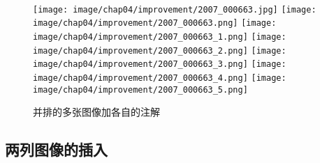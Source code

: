 \begin{figure}[h]
    \centering
        \enspace
        \enspace
        \enspace\thinspace
        \enspace\thinspace
        \enspace\thinspace
        \enspace\thinspace
        \\
        \texttt{[image: image/chap04/improvement/2007\_000663.jpg]}
        \enspace\thinspace %
        \texttt{[image: image/chap04/improvement/2007\_000663.png]}
        \enspace\thinspace
        \texttt{[image: image/chap04/improvement/2007\_000663\_1.png]}
        \enspace\thinspace
        \texttt{[image: image/chap04/improvement/2007\_000663\_2.png]}
        \enspace\thinspace
        \texttt{[image: image/chap04/improvement/2007\_000663\_3.png]}
        \enspace\thinspace
        \texttt{[image: image/chap04/improvement/2007\_000663\_4.png]}
        \enspace\thinspace
        \texttt{[image: image/chap04/improvement/2007\_000663\_5.png]}
        \enspace\thinspace
        \caption{并排的多张图像加各自的注解}
        \label{fig:improvement}
\end{figure}
    

\subsection{两列图像的插入}


